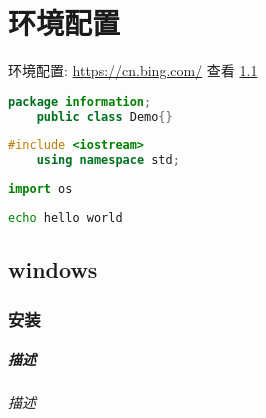 \chapter{环境配置}

环境配置: \url{https://cn.bing.com/}
查看 \ref{1}

\begin{lstlisting}[language=java]
    package information;
    public class Demo{}
\end{lstlisting}

\begin{lstlisting}[language=c++]
    #include <iostream>
    using namespace std;
\end{lstlisting}

\begin{lstlisting}[language=python]
    import os
\end{lstlisting}

\begin{lstlisting}[language=bash]
    echo hello world
\end{lstlisting}

\section{windows}\label{1}
\subsection{安装}
\newpage
\paragraph{
    描述
}
\subparagraph{
    描述
}